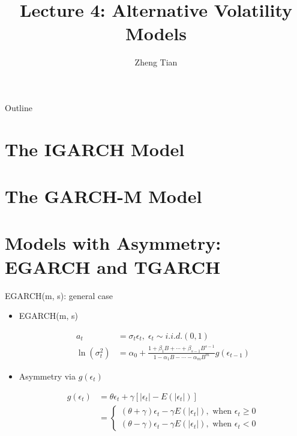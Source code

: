 \documentclass[presentation,10pt]{beamer}
\author{Zheng Tian}
\date{}
\title{Lecture 4: Alternative Volatility Models}
\begin{document}
\maketitle
\begin{frame}{Outline}
\tableofcontents
\end{frame}



\section{The IGARCH Model}
\label{sec:orgbbb9d90}

\section{The GARCH-M Model}
\label{sec:org1fa1522}

\section{Models with Asymmetry: EGARCH and TGARCH}
\label{sec:orgb56056f}

\begin{frame}[label={sec:orgfee991a}]{EGARCH(m, s): general case}
\begin{itemize}
\item EGARCH(m, s)

\begin{align*}
a_t &= \sigma_t \epsilon_t,\; \epsilon_t \sim i.i.d.(0, 1) \\
\ln(\sigma^2_t)&= \alpha_0 + \frac{1 + \beta_1 B + \cdots + \beta_{s-1} B^{s-1}}{1 - \alpha_1 B - \cdots - \alpha_m B^m} g(\epsilon_{t-1})
\end{align*}

\item Asymmetry via \(g(\epsilon_t)\)

\begin{align*}
g(\epsilon_t) &= \theta \epsilon_t + \gamma \left[ \left| \epsilon_t \right| - E \left( |\epsilon_t| \right)  \right] \\
&=
\begin{cases}
(\theta + \gamma)\epsilon_t - \gamma E(|\epsilon_t|), \text{ when } \epsilon_t \geq 0  \\
(\theta - \gamma)\epsilon_t - \gamma E(|\epsilon_t|), \text{ when } \epsilon_t < 0
\end{cases}
\end{align*}
\end{itemize}
\end{frame}
\end{document}
